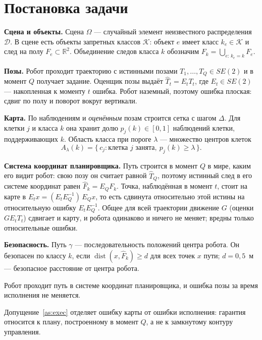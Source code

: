 \section{Постановка задачи}\label{sec:problem}

\textbf{Сцена и объекты.} Сцена $\Omega$ --- случайный элемент неизвестного распределения $\mathcal D$. В сцене есть объекты запретных классов $\mathcal K$: объект $e$ имеет класс $k_e \in \mathcal K$ и след на полу $F_e \subset \mathbb R^2$. Объединение следов класса $k$ обозначим $F_k = \bigcup_{e:\,k_e = k} F_e$.

\textbf{Позы.} Робот проходит траекторию с истинными позами $T_1, \dots, T_Q \in SE(2)$ и в момент $Q$ получает задание. Оценщик позы выдаёт $\hat T_t = E_t T_t$, где $E_t \in SE(2)$ --- накопленная к моменту $t$ ошибка. Робот наземный, поэтому ошибка плоская: сдвиг по полу и поворот вокруг вертикали.

\textbf{Карта.} По наблюдениям и \emph{оценённым} позам строится сетка с шагом $\Delta$. Для клетки $j$ и класса $k$ она хранит долю $p_j(k) \in [0, 1]$ наблюдений клетки, поддерживающих $k$. Область класса при пороге $\lambda$ --- множество центров клеток
\begin{equation}
  A_\lambda(k) = \{\, c_j : \text{клетка } j \text{ занята},\ p_j(k) \ge \lambda \,\}.
\end{equation}

\textbf{Система координат планировщика.} Путь строится в момент $Q$ в мире, каким его видит робот: свою позу он считает равной $\hat T_Q$, поэтому истинный след в его системе координат равен $\hat F_k = E_Q F_k$. Точка, наблюдённая в момент $t$, стоит на карте в $E_t x = (E_t E_Q^{-1})\, E_Q x$, то есть сдвинута относительно этой истины на относительную ошибку $E_t E_Q^{-1}$. Общее для всей траектории движение $G$ (оценки $G E_t T_t$) сдвигает и карту, и робота одинаково и ничего не меняет; вредны только относительные ошибки.

\textbf{Безопасность.} Путь $\gamma$ --- последовательность положений центра робота. Он безопасен по классу $k$, если $\operatorname{dist}(x, \hat F_k) \ge d$ для всех точек $x$ пути; $d = 0{,}5$~м --- безопасное расстояние от центра робота.

\begin{assumption}[исполнение]\label{as:exec}
Робот проходит путь в системе координат планировщика, и ошибка позы за время исполнения не меняется.
\end{assumption}

Допущение~\ref{as:exec} отделяет ошибку карты от ошибки исполнения: гарантия относится к плану, построенному в момент $Q$, а не к замкнутому контуру управления.

